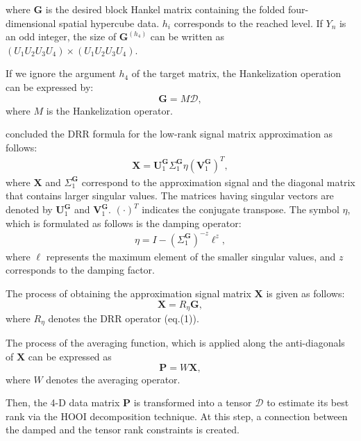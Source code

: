 where $\textbf{G}$ is the desired block Hankel matrix containing the folded four-dimensional spatial hypercube data. $h_i$ corresponds to the reached level.
If $Y_n$ is an odd integer, the size of 
$\textbf{G}^{(h_4)}$ can be written as $(U_1U_2U_3U_4)\times(U_1U_2U_3U_4)$.

If we ignore the argument $h_4$ of the target matrix, the Hankelization operation can be expressed by: 
\begin{equation}
\mathbf{G}={M}\mathcal{D},              
\end{equation}
where ${M}$ is the Hankelization operator. 

\cite{chen2016simultaneous} concluded the DRR formula for the low-rank signal matrix approximation as follows:
\begin{align}
\mathbf{X}=\mathbf{U}^{\mathbf{G}}_1{\Sigma^{\mathbf{G}}_1}\eta\left(\mathbf{V}^{\mathbf{G}}_1\right)^{{T}},
\end{align}
where $\mathbf{X}$ and ${\Sigma^{\mathbf{G}}_1}$ correspond to the approximation signal and the diagonal matrix that contains larger singular values. The matrices having singular vectors are denoted by $\mathbf{U}^{\mathbf{G}}_1$ and $\mathbf{V}^{\mathbf{G}}_1$. $\left(\cdot\right) ^{T}$ indicates the conjugate transpose. The symbol $\eta$, which is formulated as follows is the damping operator:
\begin{align}
\eta= I - (\Sigma^{\mathbf{G}}_1 )^{-{z}}{{\ell}^{z}},
\end{align} 
where ${\ell}$ represents the maximum element of the smaller singular values, and $z$ corresponds to the damping factor. 

The process of obtaining the approximation signal matrix $\mathbf{X}$ is given as follows:
\begin{equation}
\mathbf{X}=R_\eta{\mathbf{{G}}}, 
\end{equation}
where $R_\eta$ denotes the DRR operator (eq.(1)).

The process of the averaging function, which is applied along the anti-diagonals of $\mathbf{X}$ can be expressed as
\begin{equation}
\mathbf{P}={W}\mathbf{X},
\end{equation}
where ${W}$ denotes the averaging operator. 

Then, the 4-D data matrix $\mathbf{P}$ is transformed into a tensor $\mathcal{D}$ to estimate its best rank via the HOOI \citep{sheehan2007higher} decomposition technique. At this step, a connection between the damped and the tensor rank constraints is created. 

